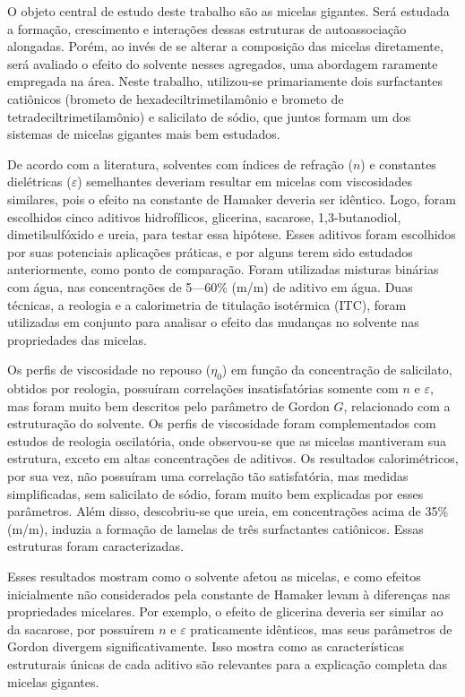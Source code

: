 \documentclass[
	12pt,				%
	openright,			%
	twoside,			%
	a4paper,			%
	english,			%
	brazil%
	]{abntex2}
\begin{document}
\setlength{\absparsep}{18pt} %
\begin{resumo}
 	O objeto central de estudo deste trabalho são as micelas gigantes. Será estudada a formação, crescimento e interações dessas estruturas de autoassociação alongadas. Porém, ao invés de se alterar a composição das micelas diretamente, será avaliado o efeito do solvente nesses agregados, uma abordagem raramente empregada na área. Neste trabalho, utilizou-se primariamente dois surfactantes catiônicos (brometo de hexadeciltrimetilamônio e brometo de tetradeciltrimetilamônio) e salicilato de sódio, que juntos formam um dos sistemas de micelas gigantes mais bem estudados.
 	
	De acordo com a literatura, solventes com índices de refração (\(n\)) e constantes dielétricas (\(\varepsilon\)) semelhantes deveriam resultar em micelas com viscosidades similares, pois o efeito na constante de Hamaker deveria ser idêntico. Logo, foram escolhidos cinco aditivos hidrofílicos, glicerina, sacarose, 1,3-butanodiol, dimetilsulfóxido e ureia, para testar essa hipótese. Esses aditivos foram escolhidos por suas potenciais aplicações práticas, e por alguns terem sido estudados anteriormente, como ponto de comparação. Foram utilizadas misturas binárias com água, nas concentrações de 5---60\% (m/m) de aditivo em água. Duas técnicas, a reologia e a calorimetria de titulação isotérmica (ITC), foram utilizadas em conjunto para analisar o efeito das mudanças no solvente nas propriedades das micelas. 
	
	Os perfis de viscosidade no repouso (\(\eta_0\)) em função da concentração de salicilato, obtidos por reologia, possuíram correlações insatisfatórias somente com \(n\) e \(\varepsilon\), mas foram muito bem descritos pelo parâmetro de Gordon \(G\), relacionado com a estruturação do solvente. Os perfis de viscosidade foram complementados com estudos de reologia oscilatória, onde observou-se que as micelas mantiveram sua estrutura, exceto em altas concentrações de aditivos. Os resultados calorimétricos, por sua vez, não possuíram uma correlação tão satisfatória, mas medidas simplificadas, sem salicilato de sódio, foram muito bem explicadas por esses parâmetros. Além disso, descobriu-se que ureia, em concentrações acima de 35\% (m/m), induzia a formação de lamelas de três surfactantes catiônicos. Essas estruturas foram caracterizadas.
	
	Esses resultados mostram como o solvente afetou as micelas, e como efeitos inicialmente não considerados pela constante de Hamaker levam à diferenças nas propriedades micelares. Por exemplo, o efeito de glicerina deveria ser similar ao da sacarose, por possuírem \(n\) e \(\varepsilon\) praticamente idênticos, mas seus parâmetros de Gordon divergem significativamente. Isso mostra como as características estruturais únicas de cada aditivo são relevantes para a explicação completa das micelas gigantes.
	

\end{resumo}
\end{document}
